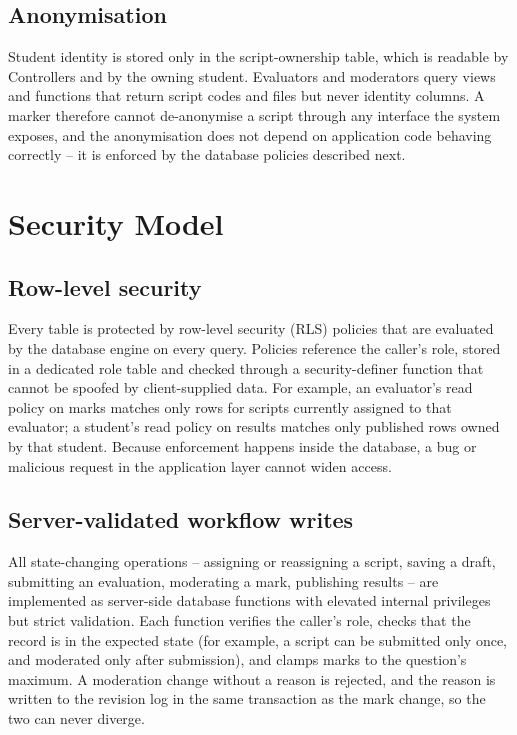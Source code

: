 \documentclass[conference]{IEEEtran}
\begin{document}
\subsection{Anonymisation}
Student identity is stored only in the script-ownership table, which is readable by Controllers and by the owning student. Evaluators and moderators query views and functions that return script codes and files but never identity columns. A marker therefore cannot de-anonymise a script through any interface the system exposes, and the anonymisation does not depend on application code behaving correctly -- it is enforced by the database policies described next.

\section{Security Model}
\subsection{Row-level security}
Every table is protected by row-level security (RLS) policies that are evaluated by the database engine on every query. Policies reference the caller's role, stored in a dedicated role table and checked through a security-definer function that cannot be spoofed by client-supplied data. For example, an evaluator's read policy on marks matches only rows for scripts currently assigned to that evaluator; a student's read policy on results matches only published rows owned by that student. Because enforcement happens inside the database, a bug or malicious request in the application layer cannot widen access.

\subsection{Server-validated workflow writes}
All state-changing operations -- assigning or reassigning a script, saving a draft, submitting an evaluation, moderating a mark, publishing results -- are implemented as server-side database functions with elevated internal privileges but strict validation. Each function verifies the caller's role, checks that the record is in the expected state (for example, a script can be submitted only once, and moderated only after submission), and clamps marks to the question's maximum. A moderation change without a reason is rejected, and the reason is written to the revision log in the same transaction as the mark change, so the two can never diverge.
\end{document}
